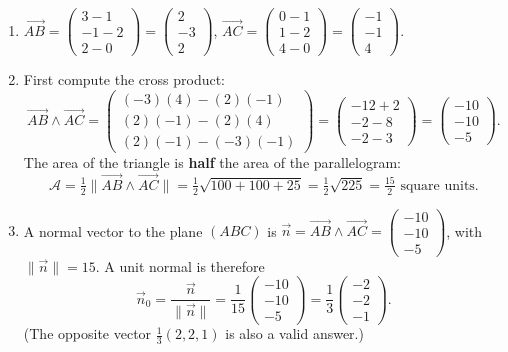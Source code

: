\documentclass[11pt]{article}
\begin{document}
\begin{corrige}
\begin{enumerate}
\item $\vec{AB} = \begin{pmatrix} 3-1 \\ -1-2 \\ 2-0 \end{pmatrix} = \begin{pmatrix} 2 \\ -3 \\ 2 \end{pmatrix}$, \quad
$\vec{AC} = \begin{pmatrix} 0-1 \\ 1-2 \\ 4-0 \end{pmatrix} = \begin{pmatrix} -1 \\ -1 \\ 4 \end{pmatrix}$.
\item First compute the cross product:
\[
\vec{AB} \wedge \vec{AC} = \begin{pmatrix} (-3)(4) - (2)(-1) \\ (2)(-1) - (2)(4) \\ (2)(-1) - (-3)(-1) \end{pmatrix}
= \begin{pmatrix} -12 + 2 \\ -2 - 8 \\ -2 - 3 \end{pmatrix}
= \begin{pmatrix} -10 \\ -10 \\ -5 \end{pmatrix}.
\]
The area of the triangle is \textbf{half} the area of the parallelogram:
\[
\mathcal{A} = \tfrac{1}{2}\|\vec{AB} \wedge \vec{AC}\| = \tfrac{1}{2}\sqrt{100 + 100 + 25} = \tfrac{1}{2}\sqrt{225} = \tfrac{15}{2} \text{ square units}.
\]
\item A normal vector to the plane $(ABC)$ is $\vec{n} = \vec{AB} \wedge \vec{AC} = \begin{pmatrix} -10 \\ -10 \\ -5 \end{pmatrix}$, with $\|\vec{n}\| = 15$. A unit normal is therefore
\[
\vec{n}_0 = \frac{\vec{n}}{\|\vec{n}\|} = \frac{1}{15}\begin{pmatrix} -10 \\ -10 \\ -5 \end{pmatrix} = \frac{1}{3}\begin{pmatrix} -2 \\ -2 \\ -1 \end{pmatrix}.
\]
(The opposite vector $\tfrac{1}{3}(2, 2, 1)$ is also a valid answer.)
\end{enumerate}
\end{corrige}
\end{document}
